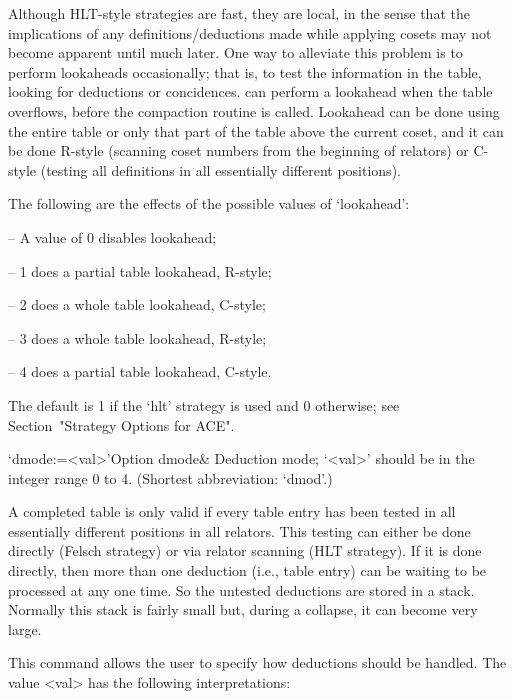 Although HLT-style strategies  are fast, they are local,  in the sense
that  the  implications   of  any  definitions/deductions  made  while
applying cosets may not become  apparent until much later.  One way to
alleviate this problem is to perform lookaheads occasionally; that is,
to  test the  information  in  the table,  looking  for deductions  or
concidences.  {\ACE} can perform a lookahead when the table overflows,
before the compaction routine is  called.  Lookahead can be done using
the entire  table or  only that  part of the  table above  the current
coset, and  it can  be done R-style  (scanning coset numbers  from the
beginning  of relators)  or C-style  (testing all  definitions  in all
essentially different positions).

The following are the effects of the possible values of `lookahead':

\beginlist

\item{--} A value of 0 disables lookahead;
\item{--} 1 does a partial table lookahead, R-style; 
\item{--} 2 does a whole table lookahead, C-style; 
\item{--} 3 does a whole table lookahead, R-style; 
\item{--} 4 does a partial table lookahead, C-style.  

\endlist

The default is 1 if the `hlt' strategy is used and  0  otherwise;  see
Section~"Strategy Options for ACE".


\>`dmode:=<val>'{Option dmode}&
Deduction mode; `<val>' should be in the integer range 0 to 4.
(Shortest abbreviation: `dmod'.)

A completed table  is only valid if every table  entry has been tested
in all essentially different  positions in all relators.  This testing
can either be done directly  (Felsch strategy) or via relator scanning
(HLT strategy).  If it is  done directly, then more than one deduction
(i.e., table  entry) can be waiting  to be processed at  any one time.
So the untested deductions are stored in a stack.  Normally this stack
is fairly small but, during a collapse, it can become very large.

This command allows the user  to  specify  how  deductions  should  be
handled. The value <val> has the following interpretations:

